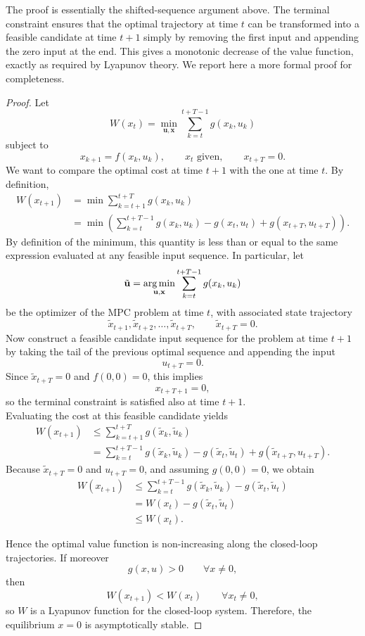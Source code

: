 The proof is essentially the shifted-sequence argument above. The terminal constraint ensures that the optimal trajectory at time $t$ can be transformed into a feasible candidate at time $t+1$ simply by removing the first input and appending the zero input at the end. This gives a monotonic decrease of the value function, exactly as required by Lyapunov theory. We report here a more formal proof for completeness.
\begin{proof}
Let
\[
W(x_t)=\min_{\mathbf{u},\mathbf{x}} \sum_{k=t}^{t+T-1} g(x_k,u_k)
\]
subject to
\[
x_{k+1}=f(x_k,u_k), \qquad x_t \text{ given}, \qquad x_{t+T}=0.
\]
We want to compare the optimal cost at time $t+1$ with the one at time $t$. By definition,
\begin{align*}
W(x_{t+1})
&= \min \sum_{k=t+1}^{t+T} g(x_k,u_k) \\
&= \min \left( \sum_{k=t}^{t+T-1} g(x_k,u_k) - g(x_t,u_t) + g(x_{t+T},u_{t+T}) \right).
\end{align*}
By definition of the minimum, this quantity is less than or equal to the same expression evaluated at any feasible input sequence. In particular, let
\[
\tilde{\mathbf{u}}
=
\operatorname*{arg\,min}_{\mathbf{u},\mathbf{x}}
\sum_{k=t}^{t+T-1} g(x_k,u_k)
\]
be the optimizer of the MPC problem at time $t$, with associated state trajectory
\[
\tilde{x}_{t+1},\tilde{x}_{t+2},\dots,\tilde{x}_{t+T},
\qquad \tilde{x}_{t+T}=0.
\]
Now construct a feasible candidate input sequence for the problem at time $t+1$ by taking the tail of the previous optimal sequence and appending the input
\[
u_{t+T}=0.
\]
Since $\tilde{x}_{t+T}=0$ and $f(0,0)=0$, this implies
\[
x_{t+T+1}=0,
\]
so the terminal constraint is satisfied also at time $t+1$.\\
Evaluating the cost at this feasible candidate yields
\begin{align*}
W(x_{t+1})
&\le
\sum_{k=t+1}^{t+T} g(\tilde{x}_k,\tilde{u}_k) \\
&=
\sum_{k=t}^{t+T-1} g(\tilde{x}_k,\tilde{u}_k)
- g(\tilde{x}_t,\tilde{u}_t)
+ g(\tilde{x}_{t+T},u_{t+T}).
\end{align*}
Because $\tilde{x}_{t+T}=0$ and $u_{t+T}=0$, and assuming $g(0,0)=0$, we obtain
\begin{align*}
W(x_{t+1})
&\le
\sum_{k=t}^{t+T-1} g(\tilde{x}_k,\tilde{u}_k)
- g(\tilde{x}_t,\tilde{u}_t) \\
&=
W(x_t)-g(\tilde{x}_t,\tilde{u}_t) \\
&\le W(x_t).
\end{align*}

Hence the optimal value function is non-increasing along the closed-loop trajectories. If moreover
\[
g(x,u)>0 \qquad \forall x\neq 0,
\]
then
\[
W(x_{t+1}) < W(x_t) \qquad \forall x_t\neq 0,
\]
so $W$ is a Lyapunov function for the closed-loop system. Therefore, the equilibrium $x=0$ is asymptotically stable.
\end{proof}

